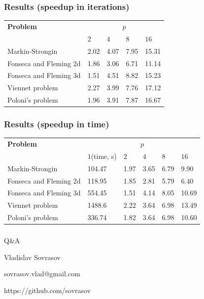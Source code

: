 \documentclass[aspectratio=1610]{beamer}
\begin{document}
\begin{frame}
  \frametitle{Results (speedup in iterations)}
  \begin{table}
    \centering
    \begin{tabular}{|l|p{1.5cm}|p{1.5cm}|p{1.5cm}|p{1.5cm}|}
  \hline
  \textbf{Problem} & \multicolumn{4}{c|}{\(p\)}\\
  \cline{2-5}
    & \(2\) & \(4\) & \(8\) & \(16\)\\
  \hline
  Markin-Strongin & 2.02 & 4.07 & 7.95 & 15.31 \\
  \hline
  Fonseca and Fleming 2d & 1.86 & 3.06 & 6.71 & 11.14 \\
  \hline
  Fonseca and Fleming 3d & 1.51 & 4.51 & 8.82 & 15.23 \\
  \hline
  Viennet problem & 2.27 & 3.99 & 7.76 & 17.12\\
  \hline
  Poloni's problem & 1.96 & 3.91 & 7.87 & 16.67 \\
  \hline
  \end{tabular}
  \end{table}

\end{frame}

\begin{frame}
  \frametitle{Results (speedup in time)}
  \begin{table}[ht]
    \centering
    \begin{tabular}{|l|p{1.6cm}|p{1.5cm}|p{1.5cm}|p{1.5cm}|p{1.5cm}|}
  \hline
  \textbf{Problem} & \multicolumn{5}{c|}{\(p\)}\\
  \cline{2-6}
  &\(1\)(time, s) & \(2\) & \(4\) & \(8\) & \(16\)\\
  \hline
  Markin-Strongin & 104.47 & 1.97 & 3.65 & 6.79 & 9.90 \\
  \hline
  Fonseca and Fleming 2d & 118.95 & 1.85 & 2.81 & 5.79 & 6.40 \\
  \hline
  Fonseca and Fleming 3d & 554.45 & 1.51 & 4.14 & 8.05 & 10.69 \\
  \hline
  Viennet problem & 1488.6 & 2.22 & 3.64 & 6.98 & 13.49\\
  \hline
  Poloni's problem & 336.74 & 1.82 & 3.64 & 6.98 & 10.60 \\
  \hline
  \end{tabular}
  \end{table}
\end{frame}


\begin{frame}{{}}
  \frametitle{ }
  \begin{center}
    \Large{Q\&A}

\vspace{1cm}
    Vladislav Sovrasov

    sovrasov.vlad@gmail.com

    https://github.com/sovrasov
  \end{center}
\end{frame}
\end{document}
